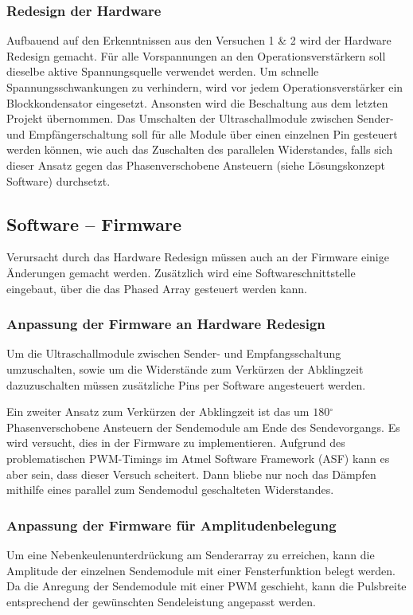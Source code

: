 \documentclass[10pt,a4paper,oneside]{99_fhnwreport}
\begin{document}
\subsubsection*{Redesign der Hardware}
Aufbauend auf den Erkenntnissen aus den Versuchen 1 \& 2 wird der Hardware Redesign gemacht. Für alle Vorspannungen an den Operationsverstärkern soll dieselbe aktive Spannungsquelle verwendet werden. Um schnelle Spannungsschwankungen zu verhindern, wird vor jedem Operationsverstärker ein Blockkondensator eingesetzt. Ansonsten wird die Beschaltung aus dem letzten Projekt übernommen. Das Umschalten der Ultraschallmodule zwischen Sender- und Empfängerschaltung soll für alle Module über einen einzelnen Pin gesteuert werden können, wie auch das Zuschalten des parallelen Widerstandes, falls sich dieser Ansatz gegen das Phasenverschobene Ansteuern (siehe Lösungskonzept Software) durchsetzt.

\subsection*{Software -- Firmware}
Verursacht durch das Hardware Redesign müssen auch an der Firmware einige Änderungen gemacht werden. Zusätzlich wird eine Softwareschnittstelle eingebaut, über die das Phased Array gesteuert werden kann.

\subsubsection*{Anpassung der Firmware an Hardware Redesign}
Um die Ultraschallmodule zwischen Sender- und Empfangsschaltung umzuschalten, sowie um die Widerstände zum Verkürzen der Abklingzeit dazuzuschalten müssen zusätzliche Pins per Software angesteuert werden.

Ein zweiter Ansatz zum Verkürzen der Abklingzeit ist das um $180 \mathrm{^{\circ}}$ Phasenverschobene Ansteuern der Sendemodule am Ende des Sendevorgangs. Es wird versucht, dies in der Firmware zu implementieren. Aufgrund des problematischen PWM-Timings im Atmel Software Framework (ASF) kann es aber sein, dass dieser Versuch scheitert. Dann bliebe nur noch das Dämpfen mithilfe eines parallel zum Sendemodul geschalteten Widerstandes.

\subsubsection*{Anpassung der Firmware für Amplitudenbelegung}
Um eine Nebenkeulenunterdrückung am Senderarray zu erreichen, kann die Amplitude der einzelnen Sendemodule mit einer Fensterfunktion belegt werden. Da die Anregung der Sendemodule mit einer PWM geschieht, kann die Pulsbreite entsprechend der gewünschten Sendeleistung angepasst werden.
\end{document}
